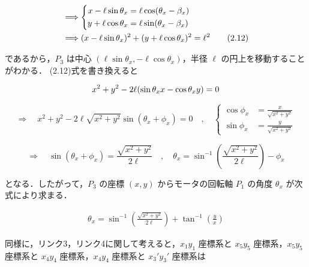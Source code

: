     \begin{align}
    &\Longrightarrow
    \left\{
    \begin{aligned}
    x - \ell \sin\theta_x &= \ell \cos(\theta_x - \beta_x) \\
    y + \ell \cos\theta_x &= \ell \sin(\theta_x - \beta_x)
    \end{aligned}
    \right. \notag \\
    &\Longrightarrow
    (x - \ell \sin\theta_x)^2 + (y + \ell \cos\theta_x)^2 = \ell^2
    \tag{2.12}
    \end{align}
    
    
    
    であるから，$P_3$ は中心 $(\ell \sin\theta_x, -\ell \cos\theta_x)$，半径 $\ell$ の円上を移動することがわかる．
    (2.12)式を書き換えると
    
    \begin{align}
    x^2 + y^2 - 2\ell (\sin\theta_x x - \cos\theta_x y) = 0
    \notag
    \end{align}
    
    \[
    \Longrightarrow
    \quad
    x^2 + y^2 - 2\ell \sqrt{x^2 + y^2} \sin(\theta_x + \phi_x) = 0
    \quad , \quad
    \left\{
    \begin{aligned}
    \cos\phi_x &= \frac{x}{\sqrt{x^2 + y^2}} \\
    \sin\phi_x &= \frac{y}{\sqrt{x^2 + y^2}}
    \end{aligned}
    \right.
    \]
    
    \[
    \Longrightarrow
    \quad
    \sin(\theta_x + \phi_x) = \frac{\sqrt{x^2 + y^2}}{2\ell}
    \quad , \quad
    \theta_x = \sin^{-1} \left( \frac{\sqrt{x^2 + y^2}}{2\ell} \right) - \phi_x
    \tag{2.13}
    \]
    
    となる．したがって，$P_3$ の座標 $(x, y)$ からモータの回転軸 $P_1$ の角度 $\theta_x$ が次式により求まる．
    
    \begin{align}
    \theta_x = \sin^{-1} \left( \frac{\sqrt{x^2 + y^2}}{2\ell} \right) + \tan^{-1} \left( \frac{y}{x} \right)
    \tag{2.14}
    \end{align}
    
    同様に，リンク3，リンク4に関して考えると，$x_1 y_1$ 座標系と $x_5 y_5$ 座標系，$x_5 y_5$ 座標系と $x_4 y_4$ 座標系，$x_4 y_4$ 座標系と $x_3' y_3'$ 座標系は

